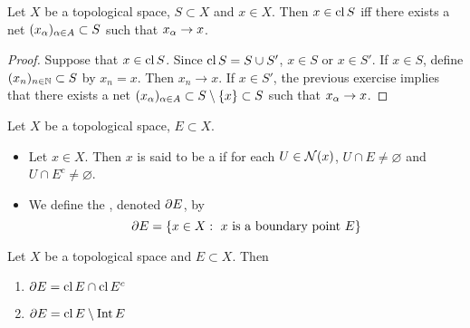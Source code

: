 \documentclass{book}
\begin{document}
	\begin{ex}  
	Let $X$ be a topological space, $S \subset X$ and $x \in X$. Then $x \in \operatorname{cl} S$ iff there exists a net $(x_{\alpha})_{\alpha \in A} \subset S$ such that $x_{\alpha} \rightarrow x$. 
	\end{ex}

	\begin{proof}
	Suppose that $x \in \operatorname{cl} S$. Since $\operatorname{cl} S = S \cup S'$, $x \in S$ or $x \in S'$. If $x \in S$, define $(x_n)_{n \in \mathbb{N}} \subset S$ by $x_n = x$. Then $x_n \rightarrow x$. If $x \in S'$, the previous exercise implies that there exists a net $(x_{\alpha})_{\alpha \in A} \subset S \setminus \{x\} \subset S$ such that $x_{\alpha} \rightarrow x$. 
	\end{proof}

	\begin{defn} 
		Let $X$ be a topological space, $E \subset X$.  
		\begin{itemize}
			\item Let $x \in X$. Then $x$ is said to be a  if for each $U \in \mathcal{N}(x)$, $U \cap E \neq \varnothing$ and $U \cap E^c \neq \varnothing$.
			\item We define the , denoted $\partial E$, by 
			$$\partial E = \{x \in X: \text{ $x$ is a boundary point $E$}\}$$
		\end{itemize}
	\end{defn}
	
	\begin{ex} 
		Let $X$ be a topological space and $E \subset X$. Then 
		\begin{enumerate}
			\item $\partial E = \operatorname{cl} E \cap \operatorname{cl} E^c$ 
			\item $\partial E = \operatorname{cl} E \setminus \operatorname{Int} E$
		\end{enumerate}
	\end{ex}
	
\end{document}
